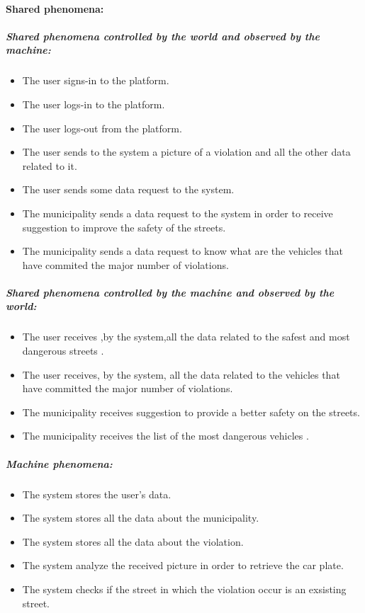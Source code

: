 \documentclass[titlepage]{article}
\begin{document}
\paragraph{Shared phenomena: }
\subparagraph{Shared phenomena controlled by the world and observed by the machine: }
\begin{itemize}
    \item The user signs-in to the platform.
    \item The user logs-in to the platform.
    \item The user logs-out from the platform.
 	\item The user sends to the system a picture of a            	violation and all the other data related to it.
 	\item The user sends some data request to the system.
	\item The municipality sends a data request to the system 		  in order to receive suggestion to improve the 				  safety 	of the streets.
	\item The municipality sends a data request to know what 			  are the vehicles that have commited the major 				  number of violations.
\end{itemize}
\subparagraph{Shared phenomena controlled by the machine and  			observed by the world: }
\begin{itemize}
	\item The user receives ,by the system,all the data 			related to the safest and most dangerous streets .
	\item The user receives, by the system, all the data related to the vehicles that have committed the major number of violations.
	\item The municipality receives suggestion to provide a better 			safety on the streets.
	\item The municipality receives the list of the most 			dangerous vehicles .
	
\end{itemize}
\subparagraph{Machine phenomena: }
\begin{itemize}
	\item The system stores the user's data.
	\item The system stores all the data about the 					municipality.
	\item The system stores all the data about the violation.
	\item The system analyze the received picture in order to 	retrieve the car plate.
	\item The system checks if the street in which the 				violation occur is an exsisting street.
\end{itemize}
\end{document}
